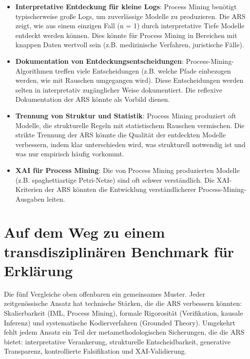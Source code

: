 \documentclass[12pt,a4paper]{article}
\begin{document}
\begin{itemize}
    \item \textbf{Interpretative Entdeckung für kleine Logs}: Process Mining 
    benötigt typischerweise große Logs, um zuverlässige Modelle zu produzieren. 
    Die ARS zeigt, wie aus einem einzigen Fall (n = 1) durch interpretative 
    Tiefe Modelle entdeckt werden können. Dies könnte für Process Mining in 
    Bereichen mit knappen Daten wertvoll sein (z.B. medizinische Verfahren, 
    juristische Fälle).
    
    \item \textbf{Dokumentation von Entdeckungsentscheidungen}: Process-Mining-Algorithmen 
    treffen viele Entscheidungen (z.B. welche Pfade einbezogen werden, wie mit 
    Rauschen umgegangen wird). Diese Entscheidungen werden selten in interpretativ 
    zugänglicher Weise dokumentiert. Die reflexive Dokumentation der ARS könnte 
    als Vorbild dienen.
    
    \item \textbf{Trennung von Struktur und Statistik}: Process Mining produziert 
    oft Modelle, die strukturelle Regeln mit statistischem Rauschen vermischen. 
    Die strikte Trennung der ARS könnte die Qualität der entdeckten Modelle 
    verbessern, indem klar unterschieden wird, was strukturell notwendig ist 
    und was nur empirisch häufig vorkommt.
    
    \item \textbf{XAI für Process Mining}: Die von Process Mining produzierten 
    Modelle (z.B. spaghettiartige Petri-Netze) sind oft schwer verständlich. 
    Die XAI-Kriterien der ARS könnten die Entwicklung verständlicherer 
    Process-Mining-Ausgaben leiten.
\end{itemize}

\section{Auf dem Weg zu einem transdisziplinären Benchmark für Erklärung}

Die fünf Vergleiche oben offenbaren ein gemeinsames Muster. Jeder zeitgenössische 
Ansatz hat technische Stärken, die die ARS verbessern könnten: Skalierbarkeit 
(IML, Process Mining), formale Rigorosität (Verifikation, kausale Inferenz) 
und systematische Kodierverfahren (Grounded Theory). Umgekehrt fehlt jedem 
Ansatz ein Teil der metamethodologischen Sicherungen, die die ARS bietet: 
interpretative Verankerung, strukturelle Entscheidbarkeit, generative 
Transparenz, kontrollierte Falsifikation und XAI-Validierung.
\end{document}
